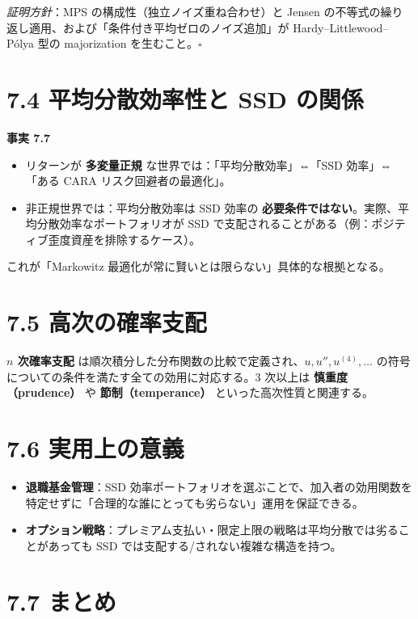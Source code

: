 \documentclass[11pt,a4paper]{report}
\begin{document}
\emph{証明方針}：MPS の構成性（独立ノイズ重ね合わせ）と Jensen の不等式の繰り返し適用、および「条件付き平均ゼロのノイズ追加」が Hardy–Littlewood–Pólya 型の majorization を生むこと。$\square$

\section{7.4 平均分散効率性と SSD の関係}

\textbf{事実 7.7}
\begin{itemize}
\item リターンが \textbf{多変量正規} な世界では：「平均分散効率」⇔「SSD 効率」⇔「ある CARA リスク回避者の最適化」。
\item 非正規世界では：平均分散効率は SSD 効率の \textbf{必要条件ではない}。実際、平均分散効率なポートフォリオが SSD で支配されることがある（例：ポジティブ歪度資産を排除するケース）。
\end{itemize}

これが「Markowitz 最適化が常に賢いとは限らない」具体的な根拠となる。

\section{7.5 高次の確率支配}

\textbf{$n$ 次確率支配} は順次積分した分布関数の比較で定義され、$u, u'', u^{(4)}, \dots$ の符号についての条件を満たす全ての効用に対応する。3 次以上は \textbf{慎重度（prudence）} や \textbf{節制（temperance）} といった高次性質と関連する。

\section{7.6 実用上の意義}

\begin{itemize}
\item \textbf{退職基金管理}：SSD 効率ポートフォリオを選ぶことで、加入者の効用関数を特定せずに「合理的な誰にとっても劣らない」運用を保証できる。
\item \textbf{オプション戦略}：プレミアム支払い・限定上限の戦略は平均分散では劣ることがあっても SSD では支配する/されない複雑な構造を持つ。
\end{itemize}

\section{7.7 まとめ}
\end{document}
